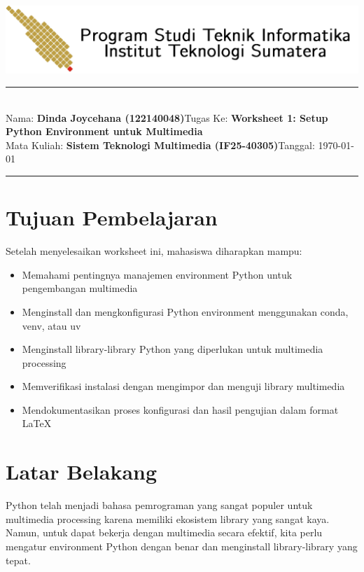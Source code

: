 \documentclass[11pt,a4paper]{article}
\newcommand{\student}{\textbf{Dinda Joycehana (122140048)}}
\newcommand{\course}{\textbf{Sistem Teknologi Multimedia (IF25-40305)}}
\newcommand{\assignment}{\textbf{Worksheet 1: Setup Python Environment untuk Multimedia}}
\begin{document}
\thispagestyle{empty}
\begin{center}
	\includegraphics[scale = 0.15]{Figure/ifitera-header.png}
	\vspace{0.1cm}
\end{center}
\noindent
\rule{17cm}{0.2cm}\\[0.3cm]
Nama: \student \hfill Tugas Ke: \assignment\\[0.1cm]
Mata Kuliah: \course \hfill Tanggal: \today\\
\rule{17cm}{0.05cm}
\vspace{0.1cm}



\section{Tujuan Pembelajaran}
Setelah menyelesaikan worksheet ini, mahasiswa diharapkan mampu:
\begin{itemize}
    \item Memahami pentingnya manajemen environment Python untuk pengembangan multimedia
    \item Menginstall dan mengkonfigurasi Python environment menggunakan conda, venv, atau uv
    \item Menginstall library-library Python yang diperlukan untuk multimedia processing
    \item Memverifikasi instalasi dengan mengimpor dan menguji library multimedia
    \item Mendokumentasikan proses konfigurasi dan hasil pengujian dalam format \LaTeX
\end{itemize}

\section{Latar Belakang}
Python telah menjadi bahasa pemrograman yang sangat populer untuk multimedia processing karena memiliki ekosistem library yang sangat kaya. Namun, untuk dapat bekerja dengan multimedia secara efektif, kita perlu mengatur environment Python dengan benar dan menginstall library-library yang tepat.
\end{document}
